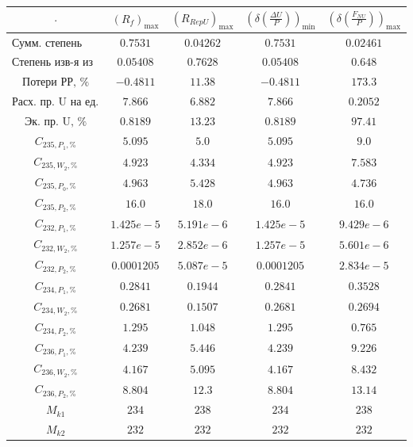 \begin{table}
    \begin{tabular}{ccccc}
        $\cdot$ & $(R_f)_\text{max}$ & $(R_{RepU})_\text{max}$ & $(\delta(\frac{\Delta U}{P}))_\text{min}$ & $(\delta(\frac{F_{NU}}{P}))_\text{max}$\\ \hline
        $\text{Сумм. степень изв-я}$ & $0.7531$ & $0.04262$ & $0.7531$ & $0.02461$\\ \hline
        $\text{Степень изв-я из рег-та}$ & $0.05408$ & $0.7628$ & $0.05408$ & $0.648$\\ \hline
        $\text{Потери РР, \%}$ & $-0.4811$ & $11.38$ & $-0.4811$ & $173.3$\\ \hline
        $\text{Расх. пр. U на ед. прод.}$ & $7.866$ & $6.882$ & $7.866$ & $0.2052$\\ \hline
        $\text{Эк. пр. U, \%}$ & $0.8189$ & $13.23$ & $0.8189$ & $97.41$\\ \hline
        $C_{235,P_1, \%}$ & $5.095$ & $5.0$ & $5.095$ & $9.0$\\ \hline
        $C_{235,W_2, \%}$ & $4.923$ & $4.334$ & $4.923$ & $7.583$\\ \hline
        $C_{235,P_0, \%}$ & $4.963$ & $5.428$ & $4.963$ & $4.736$\\ \hline
        $C_{235,P_2, \%}$ & $16.0$ & $18.0$ & $16.0$ & $16.0$\\ \hline
        $C_{232,P_1, \%}$ & $1.425e-5$ & $5.191e-6$ & $1.425e-5$ & $9.429e-6$\\ \hline
        $C_{232,W_2, \%}$ & $1.257e-5$ & $2.852e-6$ & $1.257e-5$ & $5.601e-6$\\ \hline
        $C_{232,P_2, \%}$ & $0.0001205$ & $5.087e-5$ & $0.0001205$ & $2.834e-5$\\ \hline
        $C_{234,P_1, \%}$ & $0.2841$ & $0.1944$ & $0.2841$ & $0.3528$\\ \hline
        $C_{234,W_2, \%}$ & $0.2681$ & $0.1507$ & $0.2681$ & $0.2694$\\ \hline
        $C_{234,P_2, \%}$ & $1.295$ & $1.048$ & $1.295$ & $0.765$\\ \hline
        $C_{236,P_1, \%}$ & $4.239$ & $5.446$ & $4.239$ & $9.226$\\ \hline
        $C_{236,W_2, \%}$ & $4.167$ & $5.095$ & $4.167$ & $8.432$\\ \hline
        $C_{236,P_2, \%}$ & $8.804$ & $12.3$ & $8.804$ & $13.14$\\ \hline
        $M_{k1}$ & $234$ & $238$ & $234$ & $238$\\ \hline
        $M_{k2}$ & $232$ & $232$ & $232$ & $232$\\ \hline

\end{tabular}
\end{table}
